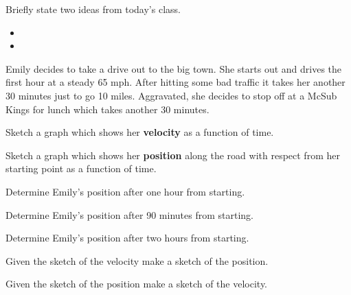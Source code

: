 \postClass

\begin{problem}
\item Briefly state two ideas from today's class.
  \begin{itemize}
  \item 
  \item 
  \end{itemize}
\item Emily decides to take a drive out to the big town. She starts
  out and drives the first hour at a steady 65 mph. After hitting some
  bad traffic it takes her another 30 minutes just to go 10
  miles. Aggravated, she decides to stop off at a McSub Kings for
  lunch which takes another 30 minutes. 


  \begin{subproblem}
  \item Sketch a graph which shows her \textbf{velocity} as a function
    of time.


      \vfill

    \item Sketch a graph which shows her \textbf{position} along the
      road with respect from her starting point as a function of time.


    \vfill

    \item Determine Emily's position after one hour from starting.
      \vspace{3em}

    \item Determine Emily's position after 90 minutes from starting.
      \vspace{3em}

    \item Determine Emily's position after two hours from starting.
      \vspace{3em}


  \end{subproblem}


  \clearpage

\item Given the sketch of the velocity make a sketch of the position.

  \scalebox{0.65}{}

\item Given the sketch of the position make a sketch of the velocity.

  \scalebox{0.65}{}

\end{problem}



